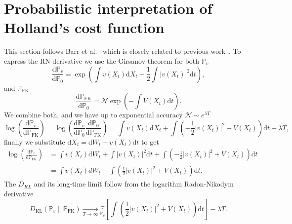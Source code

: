 \section{Probabilistic interpretation of Holland's cost function}
\label{app:holland-prob}
This section follows Barr et al.~\cite{barr2020quantum} which is closely related to previous work~\cite{dai1990markov}. To express the RN derivative we use the Girsanov theorem for both $\mathbb{P}_v$
\begin{equation}
	\frac{\mathrm{d} \mathbb{P}_{v}}{\mathrm{d} \mathbb{P}_{0}}=\exp \left(\int v\left(X_{t}\right) \mathrm{d} X_{t}-\frac{1}{2} \int\left|v\left(X_{t}\right)\right|^{2} \mathrm{d} t\right),
\end{equation}
and $\mathbb{P}_{\mathrm{FK}}$
\begin{equation}
	\label{eq:a-hp2}
	\frac{\mathrm{d} \mathbb{P}_{\mathrm{FK}}}{\mathrm{d} \mathbb{P}_{0}}=\mathcal{N} \exp \left(-\int V\left(X_{t}\right) \mathrm{d} t\right).
\end{equation}
We combine both, and we have up to exponential accuracy $\mathcal{N} \sim e^{\lambda T}$
\begin{equation}
	\log \left(\frac{\mathrm{d} \mathbb{P}_{v}}{\mathrm{d} \mathbb{P}_{\mathrm{FK}}}\right)=\log \left(\frac{\mathrm{d} \mathbb{P}_{v}}{\mathrm{d} \mathbb{P}_{0}} \frac{\mathrm{d} \mathbb{P}_{0}}{\mathrm{d} \mathbb{P}_{\mathrm{FK}}}\right) = \int v\left(X_{t}\right) \mathrm{d} X_{t}+\int \left(-\frac{1}{2}\left|v\left(X_{t}\right)\right|^{2}+V\left(X_{t}\right)\right)\mathrm{d} t - \lambda T,
\end{equation}
finally we substitute $\mathrm{d} X_t = \mathrm{d}W_t + v(X_t)\mathrm{d}t$ to get
\begin{equation}
	\begin{aligned}
	\log \left(\frac{\mathrm{d} \mathbb{P}_{v}}{\mathrm{d} \mathbb{P}_{\mathrm{FK}}}\right) 
	& =  \int v\left(X_{t}\right) \mathrm{d} W_{t} + \int |v(X_t)|^2 \mathrm{d}t + \int \left(-\frac{1}{2}\left|v\left(X_{t}\right)\right|^{2}+V\left(X_{t}\right)\right)\mathrm{d} t\\
	& =  \int v\left(X_{t}\right) d W_{t}+\int \left(\frac{1}{2}\left|v\left(X_{t}\right)\right|^{2}+V\left(X_{t}\right)\right) \mathrm{d}t.
	\end{aligned}
\end{equation}
The $D_{KL}$ and its long-time limit follow from the logarithm Radon-Nikodym derivative
\begin{equation}
	D_{\mathrm{KL}}\left(\mathbb{P}_{v} \| \mathbb{P}_{\mathrm{FK}}\right) 
	\underset{T \rightarrow \infty}{\longrightarrow} \underset{\mathbb{P}_{v}}{\mathbb{E}}\left[\int  \left(\frac{1}{2}\left|v\left(X_{t}\right)\right|^{2}+V\left(X_{t}\right)\right)\mathrm{d}t \right]-\lambda T.
\end{equation}
